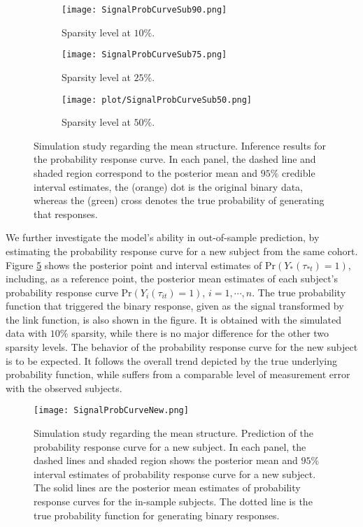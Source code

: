 \begin{figure}[t!]
\centering
\begin{subfigure}{\textwidth}
  \centering 
  \texttt{[image: SignalProbCurveSub90.png]}  
  \caption{Sparsity level at $10\%$.}
  \label{subfig:signalprobcurve90}
\end{subfigure}
\begin{subfigure}{\textwidth}
  \centering 
  \texttt{[image: SignalProbCurveSub75.png]}  
  \caption{Sparsity level at $25\%$.}
  \label{subfig:signalprobcurve75}
\end{subfigure}
\begin{subfigure}{\textwidth}
  \centering
  \texttt{[image: plot/SignalProbCurveSub50.png]}  
  \caption{Sparsity level at $50\%$.}
  \label{subfig:signalprobcurve50}
\end{subfigure}

\caption{Simulation study regarding the mean structure. Inference results for the probability response curve.  In each panel, the dashed line and shaded region correspond to the posterior mean and $95\%$ credible interval estimates, the (orange) dot is the original binary data, whereas the (green) cross denotes the true probability of generating that responses.}
\label{fig:signalprobcurvesub}
\end{figure}

We further investigate the model's ability in out-of-sample prediction, by estimating the probability response curve for a new subject from the same cohort. Figure \ref{fig:signalprobcurvenew} shows the posterior point and interval estimates of $\text{Pr}(Y_{*}(\tau_{*t})=1)$, including, as a reference point, the posterior mean estimates of each subject's probability response curve $\text{Pr}(Y_{i}(\tau_{it})=1)$, $i=1,\cdots,n$. The true probability function that triggered the binary response, given as the signal transformed by the link function, is also shown in the figure. It is obtained with the simulated data with $10\%$ sparsity, while there is no major difference for the other two sparsity levels. The behavior of the probability response curve for the new subject is to be expected. It follows the overall trend depicted by the true underlying probability function, while suffers from a comparable level of measurement error with the observed subjects.  

\begin{figure}[t!]
\centering
\texttt{[image: SignalProbCurveNew.png]}
\caption{Simulation study regarding the mean structure. Prediction of the probability response curve for a new subject. In each panel, the dashed lines and shaded region shows the posterior mean and $95\%$ interval estimates of probability response curve for a new subject. The solid lines are the posterior mean estimates of probability response curves for the in-sample subjects. The dotted line is the true probability function for generating binary responses.}
\label{fig:signalprobcurvenew}
\end{figure}

